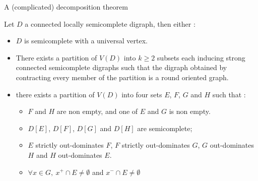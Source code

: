 \documentclass{beamer}
\begin{document}
\begin{frame}{A (complicated) decomposition theorem}

\begin{theorem}\label{thm:k12k21}
Let $D$ a connected locally semicomplete digraph, then either :
\begin{itemize}
    \item $D$ is semicomplete with a universal vertex.
    \item There exists a partition of $V(D)$ into $k\geq 2$ subsets each inducing strong connected semicomplete digraphs such that the digraph obtained by contracting every member of the partition is a round oriented graph.
    \item there exists a partition of $V(D)$ into four sets $E$, $F$, $G$ and $H$ such that :
        \begin{itemize}
            \item $F$ and $H$ are non empty, and one of $E$ and $G$ is non empty.
            \item $D[E]$, $D[F]$, $D[G]$ and $D[H]$ are semicomplete;
            \item $E$ strictly out-dominates $F$, $F$ strictly out-dominates $G$, $G$ out-dominates $H$ and $H$ out-dominates $E$.
            \item $\forall x\in G,\ x^+\cap E\neq\emptyset$  and $x^-\cap E\neq\emptyset$
        \end{itemize}
\end{itemize}
\end{theorem}
\end{frame}
\end{document}
